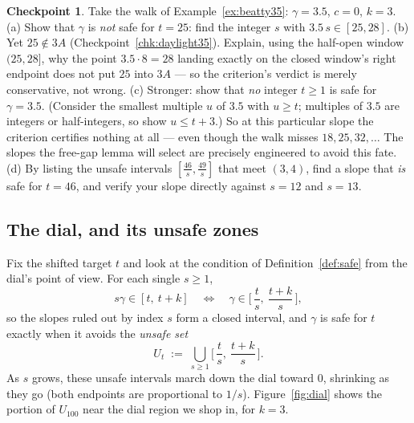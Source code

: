\documentclass[11pt,reqno]{amsart}
\theoremstyle{plain}
\theoremstyle{definition}
\newtheorem{checkpoint}[theorem]{Checkpoint}   %
\theoremstyle{remark}
\begin{document}
\begin{checkpoint}\label{chk:conservative}
Take the walk of Example~\ref{ex:beatty35}: $\gamma = 3.5$, $c = 0$, $k = 3$.
(a) Show that $\gamma$ is \emph{not} safe for $t = 25$: find the integer $s$ with
$3.5\,s \in [25, 28]$.
(b) Yet $25 \notin 3A$ (Checkpoint~\ref{chk:daylight35}). Explain, using the half-open
window $(25, 28]$, why the point $3.5 \cdot 8 = 28$ landing exactly on the closed
window's right endpoint does not put $25$ into $3A$ --- so the criterion's verdict is
merely conservative, not wrong.
(c) Stronger: show that \emph{no} integer $t \ge 1$ is safe for $\gamma = 3.5$.
(Consider the smallest multiple $u$ of $3.5$ with $u \ge t$; multiples of $3.5$ are
integers or half-integers, so show $u \le t + 3$.) So at this particular slope the
criterion certifies nothing at all --- even though the walk misses $18, 25, 32,
\dots$ The slopes the free-gap lemma will select are precisely engineered to avoid
this fate.
(d) By listing the unsafe intervals $[\frac{46}{s}, \frac{49}{s}]$ that meet
$(3, 4)$, find a slope that \emph{is} safe for $t = 46$, and verify your slope
directly against $s = 12$ and $s = 13$.
\end{checkpoint}

\subsection{The dial, and its unsafe zones}\label{sec:dial}

Fix the shifted target $t$ and look at the condition of
Definition~\ref{def:safe} from the dial's point of view. For each single $s \ge 1$,
\[
  s\gamma \in [t,\ t+k]
  \quad\Longleftrightarrow\quad
  \gamma \in \Big[\, \frac{t}{s},\ \frac{t+k}{s} \,\Big] ,
\]
so the slopes ruled out by index $s$ form a closed interval, and $\gamma$ is safe for
$t$ exactly when it avoids the \emph{unsafe set}
\[
  U_t \;:=\; \bigcup_{s \ge 1} \Big[\, \frac{t}{s},\ \frac{t+k}{s} \,\Big] .
\]
As $s$ grows, these unsafe intervals march down the dial toward $0$, shrinking as they
go (both endpoints are proportional to $1/s$). Figure~\ref{fig:dial} shows the portion
of $U_{100}$ near the dial region we shop in, for $k = 3$.
\end{document}
